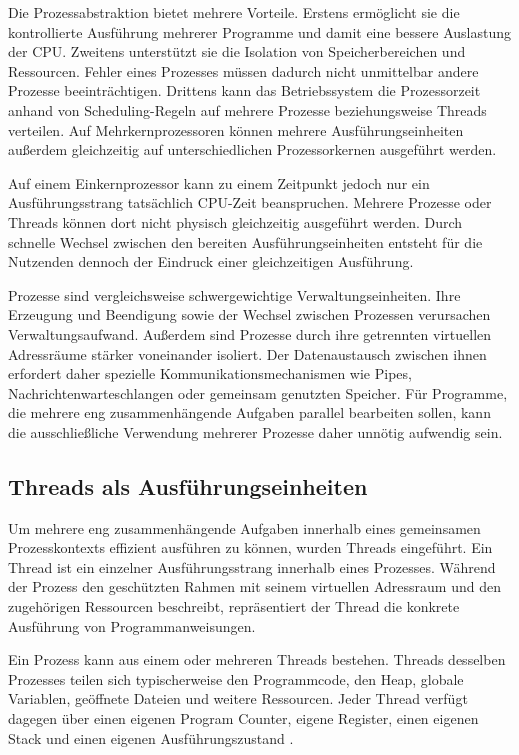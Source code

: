 Die Prozessabstraktion bietet mehrere Vorteile. Erstens ermöglicht sie die kontrollierte Ausführung mehrerer Programme und damit eine bessere Auslastung der CPU. Zweitens unterstützt sie die Isolation von Speicherbereichen und Ressourcen. Fehler eines Prozesses müssen dadurch nicht unmittelbar andere Prozesse beeinträchtigen. Drittens kann das Betriebssystem die Prozessorzeit anhand von Scheduling-Regeln auf mehrere Prozesse beziehungsweise Threads verteilen. Auf Mehrkernprozessoren können mehrere Ausführungseinheiten außerdem gleichzeitig auf unterschiedlichen Prozessorkernen ausgeführt werden.

Auf einem Einkernprozessor kann zu einem Zeitpunkt jedoch nur ein Ausführungsstrang tatsächlich CPU-Zeit beanspruchen. Mehrere Prozesse oder Threads können dort nicht physisch gleichzeitig ausgeführt werden. Durch schnelle Wechsel zwischen den bereiten Ausführungseinheiten entsteht für die Nutzenden dennoch der Eindruck einer gleichzeitigen Ausführung.

Prozesse sind vergleichsweise schwergewichtige Verwaltungseinheiten. Ihre Erzeugung und Beendigung sowie der Wechsel zwischen Prozessen verursachen Verwaltungsaufwand. Außerdem sind Prozesse durch ihre getrennten virtuellen Adressräume stärker voneinander isoliert. Der Datenaustausch zwischen ihnen erfordert daher spezielle Kommunikationsmechanismen wie Pipes, Nachrichtenwarteschlangen oder gemeinsam genutzten Speicher. Für Programme, die mehrere eng zusammenhängende Aufgaben parallel bearbeiten sollen, kann die ausschließliche Verwendung mehrerer Prozesse daher unnötig aufwendig sein.

\subsection{Threads als Ausführungseinheiten}

Um mehrere eng zusammenhängende Aufgaben innerhalb eines gemeinsamen Prozesskontexts effizient ausführen zu können, wurden Threads eingeführt. Ein Thread ist ein einzelner Ausführungsstrang innerhalb eines Prozesses. Während der Prozess den geschützten Rahmen mit seinem virtuellen Adressraum und den zugehörigen Ressourcen beschreibt, repräsentiert der Thread die konkrete Ausführung von Programmanweisungen.

Ein Prozess kann aus einem oder mehreren Threads bestehen. Threads desselben Prozesses teilen sich typischerweise den Programmcode, den Heap, globale Variablen, geöffnete Dateien und weitere Ressourcen. Jeder Thread verfügt dagegen über einen eigenen Program Counter, eigene Register, einen eigenen Stack und einen eigenen Ausführungszustand \cite{tanenbaum_moderne_betriebssysteme_de}.

